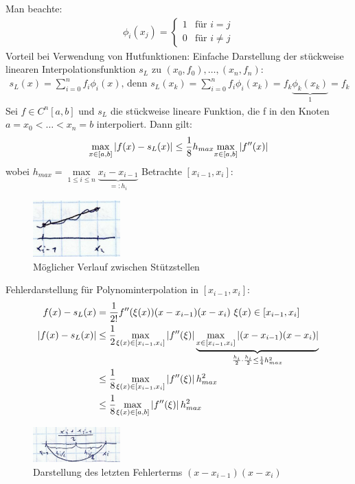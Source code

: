 Man beachte:
\begin{align*}
  \phi_i(x_j) = \begin{cases}
    1 &\mbox{für } i=j\\
    0 &\mbox{für } i \neq j
  \end{cases}
\end{align*}
Vorteil bei Verwendung von Hutfunktionen: Einfache Darstellung der stückweise
linearen Interpolationsfunktion $s_L$ zu $(x_0,f_0),\ldots,(x_n,f_n)$:
\begin{align*}
  s_L(x)=\sum_{i=0}^n f_i \phi_i(x) \text{, denn } s_L(x_k)=\sum_{i=0}^n f_i \phi_i(x_k) = f_k \underbrace{\phi_k(x_k)}_{1} = f_k
\end{align*}
 Sei $f \in C^n[a,b]$ und $s_L$ die stückweise lineare Funktion, die f in den Knoten
$a=x_0<\ldots<x_n=b$ interpoliert. Dann gilt:
\begin{align*}
  \underset{x \in [a, b]}{\max} \left| f(x)-s_L(x) \right| \leq \frac{1}{8}h_{max} \underset{x \in [a, b]}{\max} \left| f''(x) \right|
\end{align*}
wobei $h_{max} = \underset{1 \leq i \leq n}{\max} \underbrace{x_i - x_{i-1}}_{=:h_i}$
 Betrachte $[x_{i-1},x_i]$:
\begin{figure}[htbp]
  \centering
  \includegraphics[width=0.3\textwidth]{figures/zwischenstuetzstellen.png}
  \caption{Möglicher Verlauf zwischen Stützstellen}
\end{figure}
Fehlerdarstellung für Polynominterpolation in $[x_{i-1},x_i]$:
\begin{align*}
  f(x)-s_L(x) &= \frac{1}{2!} f''(\xi(x))(x-x_{i-1})(x-x_i) \,\, \xi(x) \in [x_{i-1},x_i]\\
  \left| f(x)-s_L(x) \right| &\leq \frac{1}{2} \underset{\xi(x) \in [x_{i-1},x_i]}{\max}\left| f''(\xi) \right| 
  \underbrace{\underset{x \in [x_{i-1},x_i]}{\max}\left| (x-x_{i-1})(x-x_i) \right|}_{\frac{h_i}{2}\cdot\frac{h_i}{2}\leq\frac{1}{4}h_{max}^2}\\
  &\leq \frac{1}{8} \underset{\xi(x) \in [x_{i-1},x_i]}{\max}\left| f''(\xi) \right| h_{max}^2\\
  &\leq \frac{1}{8} \underset{\xi(x) \in [a,b]}{\max}\left| f''(\xi) \right| h_{max}^2\\
\end{align*}
\begin{figure}[htbp]
  \centering
  \includegraphics[width=0.3\textwidth]{figures/fehler_letzter_teil.png}
  \caption{Darstellung des letzten Fehlerterms $(x-x_{i-1})(x-x_i)$}
\end{figure}
